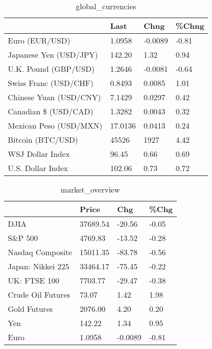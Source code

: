 \documentclass{article}%
\begin{document}
%


\begin{table}[htbp]%
\caption{global\_currencies}%
\centering%
\begin{adjustbox}{width=1\textwidth}%
\begin{tabular}{llll}
\toprule
                       &    Last &    Chng & \%Chng \\
\midrule
        Euro (EUR/USD) &  1.0958 & -0.0089 & -0.81 \\
Japanese Yen (USD/JPY) &  142.20 &    1.32 &  0.94 \\
  U.K. Pound (GBP/USD) &  1.2646 & -0.0081 & -0.64 \\
 Swiss Franc (USD/CHF) &  0.8493 &  0.0085 &  1.01 \\
Chinese Yuan (USD/CNY) &  7.1429 &  0.0297 &  0.42 \\
  Canadian \$ (USD/CAD) &  1.3282 &  0.0043 &  0.32 \\
Mexican Peso (USD/MXN) & 17.0136 &  0.0413 &  0.24 \\
     Bitcoin (BTC/USD) &   45526 &    1927 &  4.42 \\
      WSJ Dollar Index &   96.45 &    0.66 &  0.69 \\
     U.S. Dollar Index &  102.06 &    0.73 &  0.72 \\
\bottomrule
\end{tabular}
%
\end{adjustbox}%
\end{table}

%


\begin{table}[htbp]%
\caption{market\_overview}%
\centering%
\begin{adjustbox}{width=1\textwidth}%
\begin{tabular}{llll}
\toprule
                  &    Price &     Chg &  \%Chg \\
\midrule
             DJIA & 37689.54 &  -20.56 & -0.05 \\
          S\&P 500 &  4769.83 &  -13.52 & -0.28 \\
 Nasdaq Composite & 15011.35 &  -83.78 & -0.56 \\
Japan: Nikkei 225 & 33464.17 &  -75.45 & -0.22 \\
     UK: FTSE 100 &  7703.77 &  -29.47 & -0.38 \\
Crude Oil Futures &    73.07 &    1.42 &  1.98 \\
     Gold Futures &  2076.00 &    4.20 &  0.20 \\
              Yen &   142.22 &    1.34 &  0.95 \\
             Euro &   1.0958 & -0.0089 & -0.81 \\
\bottomrule
\end{tabular}
%
\end{adjustbox}%
\end{table}

%
\end{document}

